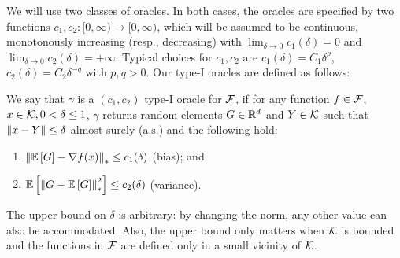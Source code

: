 We will use two classes of oracles. In both cases, the oracles are specified by
two functions $c_1,c_2:[0,\infty)\to [0,\infty)$, which will be assumed to be continuous,
monotonously increasing (resp., decreasing) with
$\lim_{\delta\to  0} c_1(\delta)=0$ and $\lim_{\delta\to 0} c_2(\delta)=+\infty$.
Typical choices for $c_1,c_2$ are $c_1(\delta) = C_1 \delta^p$, $c_2(\delta) = C_2\delta^{-q}$ with $p,q>0$.
Our type-I oracles are defined as follows:
\begin{definition}
\label{def:oracle1}
We say that $\gamma$ is a  $(c_1,c_2)$ type-I oracle for $\mathcal{F}$, if for any function $f\in \mathcal{F}$,
$x\in \mathcal{K},0<\delta\le 1$, $\gamma$ returns random elements  $G\in \mathbb{R}^d$ and  $Y\in \mathcal{K}$ such that
$\left\|x-Y\right\|\le \delta$ almost surely (a.s.) and the following hold:
\begin{enumerate}
\item $\left\| \mathbb{E}\left[G\right]  - \nabla f(x)  \right\|_* \le c_1(\delta) $ (bias); and
\item $\mathbb{E}\left[\left\| G -  \mathbb{E}\left[G\right] \right\|_*^2\right] \le c_2(\delta)$ (variance).
\end{enumerate}
\end{definition}
The upper bound on $\delta$ is arbitrary: by changing the norm, any other value can also be accommodated. Also, the upper bound only matters when $\mathcal{K}$ is bounded and the functions in $\mathcal{F}$ are defined only in a small vicinity of $\mathcal{K}$.

